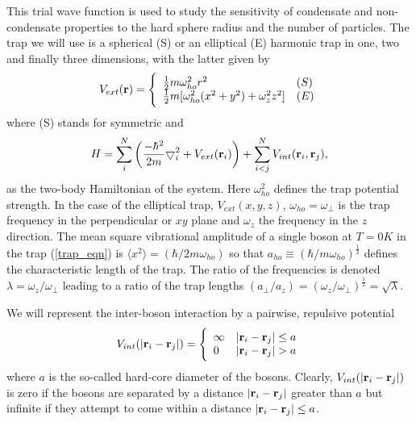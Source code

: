 \documentclass[10pt]{article}
\begin{document}
 This trial wave function is used to study the sensitivity of
 condensate and non-condensate properties to the hard sphere radius
 and the number of particles.  The trap we will use is a spherical (S)
 or an elliptical (E) harmonic trap in one, two and finally three
 dimensions, with the latter given by
  \begin{equation}
 V_{ext}({\bf r}) = 
 \Bigg\{
 \begin{array}{ll}
	 \frac{1}{2}m\omega_{ho}^2r^2 & (S)\\
 \strut
	 \frac{1}{2}m[\omega_{ho}^2(x^2+y^2) + \omega_z^2z^2] & (E)
 \label{trap_eqn}
 \end{array}
 \end{equation}
 where (S) stands for symmetric and 
 \begin{equation}
     H = \sum_i^N \left(
	 \frac{-\hbar^2}{2m}
	 { \bigtriangledown }_{i}^2 +
	 V_{ext}({\bf{r}}_i)\right)  +
	 \sum_{i<j}^{N} V_{int}({\bf{r}}_i,{\bf{r}}_j),
 \end{equation}
 as the two-body Hamiltonian of the system.  Here $\omega_{ho}^2$
 defines the trap potential strength.  In the case of the elliptical
 trap, $V_{ext}(x,y,z)$, $\omega_{ho}=\omega_{\perp}$ is the trap
 frequency in the perpendicular or $xy$ plane and $\omega_z$ the
 frequency in the $z$ direction.  The mean square vibrational
 amplitude of a single boson at $T=0K$ in the trap (\ref{trap_eqn}) is
 $\langle x^2\rangle=(\hbar/2m\omega_{ho})$ so that $a_{ho} \equiv
 (\hbar/m\omega_{ho})^{\frac{1}{2}}$ defines the characteristic length
 of the trap.  The ratio of the frequencies is denoted
 $\lambda=\omega_z/\omega_{\perp}$ leading to a ratio of the trap
 lengths $(a_{\perp}/a_z)=(\omega_z/\omega_{\perp})^{\frac{1}{2}} =
 \sqrt{\lambda}$.

 We will represent the inter-boson interaction by a pairwise,
 repulsive potential
 \begin{equation}
 V_{int}(|{\bf r}_i-{\bf r}_j|) =  \Bigg\{
 \begin{array}{ll}
	 \infty & {|{\bf r}_i-{\bf r}_j|} \leq {a}\\
	 0 & {|{\bf r}_i-{\bf r}_j|} > {a}
 \end{array}
 \end{equation}
 where ${a}$ is the so-called hard-core diameter of the bosons.
 Clearly, $V_{int}(|{\bf r}_i-{\bf r}_j|)$ is zero if the bosons are
 separated by a distance $|{\bf r}_i-{\bf r}_j|$ greater than $a$ but
 infinite if they attempt to come within a distance $|{\bf r}_i-{\bf r}_j| \leq a$.
\end{document}
